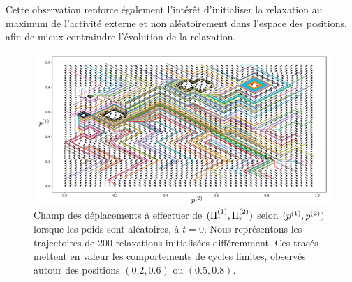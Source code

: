 \documentclass[../main]{subfiles}
\begin{document}
Cette observation renforce également l'intérêt d'initialiser la relaxation au maximum de l'activité externe et non aléatoirement dans l'espace des positions, afin de mieux contraindre l'évolution de la relaxation.

	\begin{figure}
		\centering
		\includegraphics[width=\textwidth]{champ_006_t1.pdf}
		\caption{Champ des déplacements à effectuer de $(\Pi^{({1})}_\tau, \Pi^{({2})}_\tau)$ selon $(p^{({1})}, p^{({2})})$ lorsque les poids sont aléatoires, à $t=0$. Nous représentons les trajectoires de 200 relaxations initialisées différemment. Ces tracés mettent en valeur les comportements de cycles limites, observés autour des positions $(0.2, 0.6)$ ou $(0.5, 0.8)$.}
		\label{fig:champ_0}
		\end{figure}
		
\end{document}
